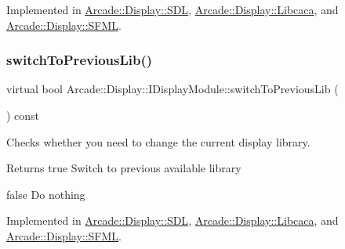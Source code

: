 Implemented in \mbox{\hyperlink{classArcade_1_1Display_1_1SDL_ad9bf495fb4e7499c81b2d65a0602e7f1}{Arcade\+::\+Display\+::\+S\+DL}}, \mbox{\hyperlink{classArcade_1_1Display_1_1Libcaca_a2bb528b251b6845c1f429f9f7dc58f4f}{Arcade\+::\+Display\+::\+Libcaca}}, and \mbox{\hyperlink{classArcade_1_1Display_1_1SFML_ae5dbff9dd547fb0a09e478e11bf74c11}{Arcade\+::\+Display\+::\+S\+F\+ML}}.

\mbox{\label{classArcade_1_1Display_1_1IDisplayModule_a498d51597164e9f92e97ec2afee426b0}} 
\subsubsection{\texorpdfstring{switchToPreviousLib()}{switchToPreviousLib()}}
{\footnotesize\ttfamily virtual bool Arcade\+::\+Display\+::\+I\+Display\+Module\+::switch\+To\+Previous\+Lib (\begin{DoxyParamCaption}{ }\end{DoxyParamCaption}) const\hspace{0.3cm}{\ttfamily [pure virtual]}}



Checks whether you need to change the current display library. 

\begin{DoxyReturn}{Returns}
true Switch to previous available library 

false Do nothing 
\end{DoxyReturn}


Implemented in \mbox{\hyperlink{classArcade_1_1Display_1_1SDL_a27364feeadd0eb907f91e9e4c2ec1ef2}{Arcade\+::\+Display\+::\+S\+DL}}, \mbox{\hyperlink{classArcade_1_1Display_1_1Libcaca_a2a195b508b59233ca226adfb9716754b}{Arcade\+::\+Display\+::\+Libcaca}}, and \mbox{\hyperlink{classArcade_1_1Display_1_1SFML_ae77df516bddc7ed5a4c0acdcf2443225}{Arcade\+::\+Display\+::\+S\+F\+ML}}.

